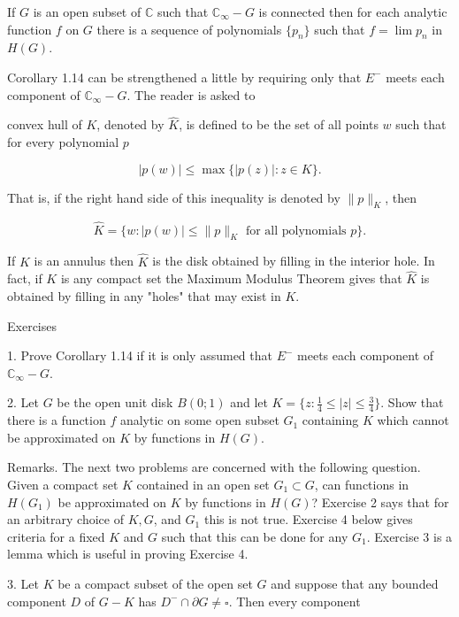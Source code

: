 If $G$ is an open subset of $\mathbb{C}$ such that $\mathbb{C}_{\infty} - G$ is connected then for each analytic function $f$ on $G$ there is a sequence of polynomials $\{p_n\}$ such that $f = \lim p_n$ in $H(G)$.

Corollary 1.14 can be strengthened a little by requiring only that $E^-$ meets each component of $\mathbb{C}_{\infty} - G$. The reader is asked to

convex hull of $K$, denoted by $\hat{K}$, is defined to be the set of all points $w$ such that for every polynomial $p$

$$|p(w)| \leq \max \{|p(z)| : z \in K\}.$$

That is, if the right hand side of this inequality is denoted by $\|p\|_K$, then

$$\hat{K} = \{w : |p(w)| \leq \|p\|_K \text{ for all polynomials } p\}.$$

If $K$ is an annulus then $\hat{K}$ is the disk obtained by filling in the interior hole. In fact, if $K$ is any compact set the Maximum Modulus Theorem gives that $\hat{K}$ is obtained by filling in any "holes" that may exist in $K$.

Exercises

1. Prove Corollary 1.14 if it is only assumed that $E^-$ meets each component of $\mathbb{C}_\infty - G$.

2. Let $G$ be the open unit disk $B(0; 1)$ and let $K = \{z : \frac{1}{4} \leq |z| \leq \frac{3}{4}\}$. Show that there is a function $f$ analytic on some open subset $G_1$ containing $K$ which cannot be approximated on $K$ by functions in $H(G)$.

Remarks. The next two problems are concerned with the following question. Given a compact set $K$ contained in an open set $G_1 \subset G$, can functions in $H(G_1)$ be approximated on $K$ by functions in $H(G)$? Exercise 2 says that for an arbitrary choice of $K, G$, and $G_1$ this is not true. Exercise 4 below gives criteria for a fixed $K$ and $G$ such that this can be done for any $G_1$. Exercise 3 is a lemma which is useful in proving Exercise 4.

3. Let $K$ be a compact subset of the open set $G$ and suppose that any bounded component $D$ of $G - K$ has $D^- \cap \partial G \neq \square$. Then every component